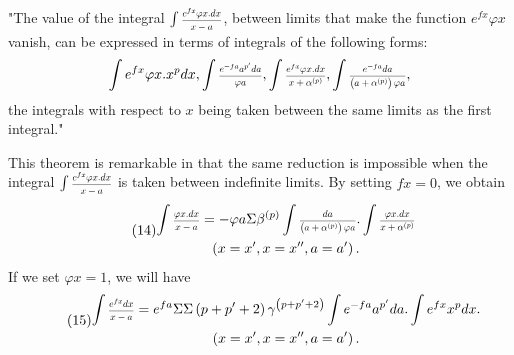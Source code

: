 \documentclass[oneside, 12 pt, leqno]{memoir}
\let\oldfrac\frac
\def\frac#1#2{\mathchoice{\text{\scalebox{.83}{${\oldfrac{#1}{#2}}$}}}{\text{\scalebox{.83}{${\displaystyle\oldfrac{#1}{#2}}$}}}{\genfrac{}{}{}{2}{#1}{#2}}{\genfrac{}{}{}{3}{#1}{#2}}}
\begin{document}
"The value of the integral \(\int \frac{e^{f x} \varphi x. d x}{x-a}\), between limits that make the function \(e^{f x} \varphi x\) vanish, can be expressed in terms of integrals of the following forms:
\[\int e^{f x} \varphi x. x^p d x, \int \frac{e^{-f a} a^{p^{\prime}} d a}{\varphi a}, \int \frac{e^{f x} \varphi x. d x}{x+\alpha^{(p)}}, \int \frac{e^{-f a} d a}{\left(a+\alpha^{(p)}\right) \varphi a},\]
the integrals with respect to \(x\) being taken between the same limits as the first integral."

This theorem is remarkable in that the same reduction is impossible when the integral \(\int \frac{e^{f x} \varphi x. d x}{x-a}\) is taken between indefinite limits. By setting \(f x=0\), we obtain
\[\tag{14}\begin{gathered}
\int \frac{\varphi x. d x}{x-a}=-\varphi a \Sigma \beta^{(p)} \int \frac{d a}{\left(a+\alpha^{(p)}\right) \varphi a}. \int \frac{\varphi x. d x}{x+\alpha^{(p)}} \\
\left(x=x^{\prime}, x=x^{\prime \prime}, a=a^{\prime}\right).
\end{gathered}\]
If we set \(\varphi x=1\), we will have
\[\tag{15}\begin{gathered}
\int \frac{e^{f x} d x}{x-a}=e^{f a} \Sigma \Sigma\left(p+p^{\prime}+2\right) \gamma^{\left(p+p^{\prime}+2\right)} \int e^{-f a} a^{p^{\prime}} d a. \int e^{f x} x^p d x. \\
\left(x=x^{\prime}, x=x^{\prime \prime}, a=a^{\prime}\right).
\end{gathered}\]
\end{document}
